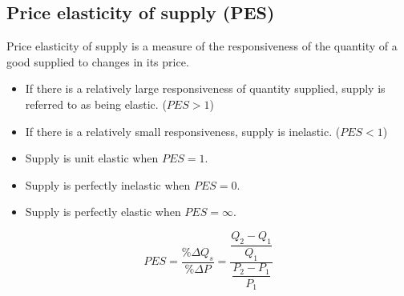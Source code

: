 \documentclass[a4paper,12pt]{article}
\begin{document}
\subsection{Price elasticity of supply (PES)}
Price elasticity of supply is a measure of the responsiveness of the quantity of a good supplied to changes in its price. 
\begin{itemize}
  \item If there is a relatively large responsiveness of quantity supplied, supply is referred to as being elastic. ($PES>1$)
  \item If there is a relatively small responsiveness, supply is inelastic. ($PES<1$)
  \item Supply is unit elastic when $PES = 1$.
  \item Supply is perfectly inelastic when $PES = 0$.
  \item Supply is perfectly elastic when $PES =\infty$.
\end{itemize}
\[PES=\dfrac{\%\Delta Q_s}{\%\Delta P}=\dfrac{\dfrac{Q_2-Q_1}{Q_1}}{\dfrac{P_2-P_1}{P_1}}\]
\end{document}
